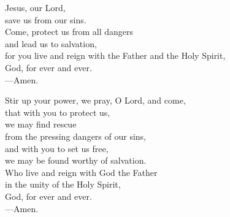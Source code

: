 \prayer


\begin{prayerverse}
Jesus, our Lord,\\
save us from our sins.\\
Come, protect us from all dangers\\
and lead us to salvation,\\
for you live and reign with the Father and the Holy Spirit,\\
God, for ever and ever.\\
{\color{red}---\thinspace}Amen.
\end{prayerverse}


\begin{prayerverse}
Stir up your power, we pray, O Lord, and come,\\
that with you to protect us,\\
we may find rescue\\
from the pressing dangers of our sins,\\
and with you to set us free,\\
we may be found worthy of salvation.\\
Who live and reign with God the Father\\
in the unity of the Holy Spirit,\\
God, for ever and ever.\\
{\color{red}---\thinspace}Amen.
\end{prayerverse}

